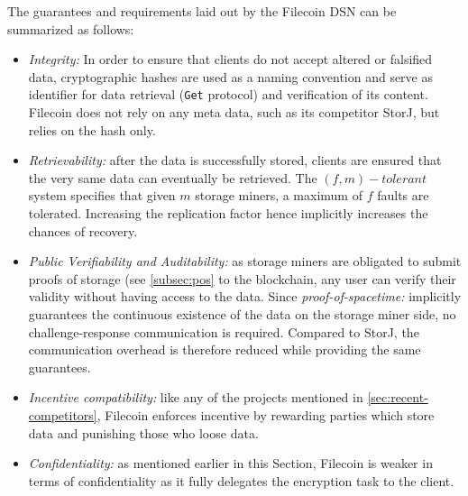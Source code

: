 \documentclass[conference]{IEEEtran}
\begin{document}
The guarantees and requirements laid out by the Filecoin DSN can be summarized as follows:
\begin{itemize}
\item \textit{Integrity:} In order to ensure that clients do not accept altered or falsified data, cryptographic hashes are used as a naming convention and serve as identifier for data retrieval (\texttt{Get} protocol) and verification of its content.
Filecoin does not rely on any meta data, such as its competitor StorJ\cite{storj}, but relies on the hash only.
\item \textit{Retrievability:} after the data is successfully stored, clients are ensured that the very same data can eventually be retrieved.
The $(f, m)-tolerant$ system specifies that given $m$ storage miners, a maximum of $f$ faults are tolerated.
Increasing the replication factor hence implicitly increases the chances of recovery.
\item \textit{Public Verifiability and Auditability:} as storage miners are obligated to submit proofs of storage (see \ref{subsec:pos} to the blockchain, any user can verify their validity without having access to the data.
Since \textit{proof-of-spacetime:} implicitly guarantees the continuous existence of the data on the storage miner side, no challenge-response communication is required.
Compared to StorJ\cite{storj}, the communication overhead is therefore reduced while providing the same guarantees.
\item \textit{Incentive compatibility:} like any of the projects mentioned in \ref{sec:recent-competitors}, Filecoin enforces incentive by rewarding parties which store data and punishing those who loose data.
\item \textit{Confidentiality:} as mentioned earlier in this Section, Filecoin is weaker in terms of confidentiality as it fully delegates the encryption task to the client.
\end{itemize}

\end{document}
